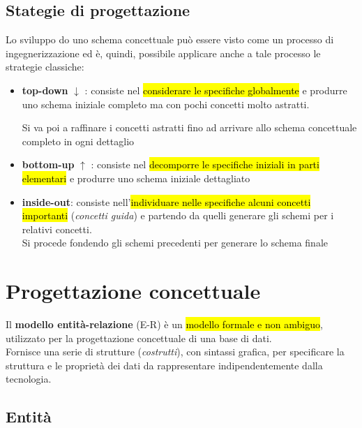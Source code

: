 \documentclass[12pt, a4paper, oneside]{book}
\begin{document}
    \section{Stategie di progettazione}
    Lo sviluppo do uno schema concettuale può essere visto come un processo di ingegnerizzazione ed è, quindi, possibile applicare anche a tale processo le strategie classiche:
    \begin{itemize}[label=$\diamond$]
      \item \textbf{top-down} $\downarrow$ : consiste nel \hl{considerare le specifiche globalmente} e produrre uno schema iniziale completo ma con pochi concetti molto astratti.
      
      Si va poi a raffinare i concetti astratti fino ad arrivare allo schema concettuale completo in ogni dettaglio

      \smallskip

      \item \textbf{bottom-up} $\uparrow$ : consiste nel \hl{decomporre le specifiche iniziali in parti elementari} e produrre uno schema iniziale dettagliato
      
      \smallskip
      
      \item \textbf{inside-out}: consiste nell’\hl{individuare nelle specifiche alcuni concetti importanti} (\textit{concetti guida}) e partendo da quelli generare gli schemi per i relativi concetti.\\[0.2ex]
    Si procede fondendo gli schemi precedenti per generare lo schema finale
    \end{itemize}




    \chapter{Progettazione concettuale}
    Il \textbf{modello entità-relazione} (E-R) è un \hl{modello formale e non ambiguo}, utilizzato per la progettazione concettuale di una base di dati.\\[0.2ex]
    Fornisce una serie di strutture (\textit{costrutti}), con sintassi grafica, per specificare la struttura e le proprietà dei dati da rappresentare indipendentemente dalla tecnologia.

    \section{Entità}
\end{document}
